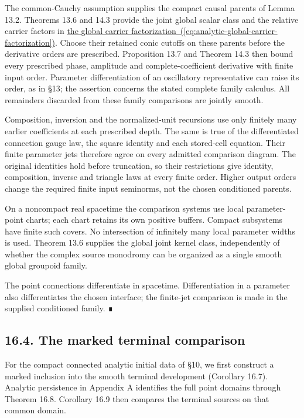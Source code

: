\documentclass[
  english,
  11pt,
  reqno]{amsart}
\begin{document}
The common-Cauchy assumption supplies the compact causal parents of
Lemma 13.2. Theorems 13.6 and 14.3 provide the joint global scalar class
and the relative carrier factors in
\hyperref[eq:analytic-global-carrier-factorization]{the global carrier
factorization~(\ref*{eq:analytic-global-carrier-factorization})}. Choose their retained conic cutoffs on these parents
before the derivative orders are prescribed. Proposition 13.7 and
Theorem 14.3 then bound every prescribed phase, amplitude and
complete-coefficient derivative with finite input order. Parameter
differentiation of an oscillatory representative can raise its order, as
in §13; the assertion concerns the stated complete family calculus. All
remainders discarded from these family comparisons are jointly smooth.

Composition, inversion and the normalized-unit recursions use only
finitely many earlier coefficients at each prescribed depth. The same is
true of the differentiated connection gauge law, the square identity and
each stored-cell equation. Their finite parameter jets therefore agree
on every admitted comparison diagram. The original identities hold
before truncation, so their restrictions give identity, composition,
inverse and triangle laws at every finite order. Higher output orders
change the required finite input seminorms, not the chosen conditioned
parents.

On a noncompact real spacetime the comparison systems use local
parameter-point charts; each chart retains its own positive buffers.
Compact subsystems have finite such covers. No intersection of
infinitely many local parameter widths is used. Theorem 13.6 supplies
the global joint kernel class, independently of whether the complex
source monodromy can be organized as a single smooth global groupoid
family.

The point connections differentiate in spacetime. Differentiation in a
parameter also differentiates the chosen interface; the finite-jet
comparison is made in the supplied conditioned family. ∎

\protect{}\label{sec:analytic-smooth-terminal-comparison}

\subsection{16.4. The marked terminal
comparison}\label{the-marked-terminal-comparison}

For the compact connected analytic initial data of §10, we first
construct a marked inclusion into the smooth terminal development
(Corollary 16.7). Analytic persistence in Appendix A identifies the full
point domains through Theorem 16.8. Corollary 16.9 then compares the
terminal sources on that common domain.
\end{document}
